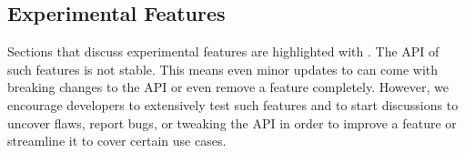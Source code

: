 \subsection{Experimental Features}

Sections that discuss experimental features are highlighted with \experimental. The API of such features is not stable. This means even minor updates to \lib can come with breaking changes to the API or even remove a feature completely. However, we encourage developers to extensively test such features and to start discussions to uncover flaws, report bugs, or tweaking the API in order to improve a feature or streamline it to cover certain use cases.
